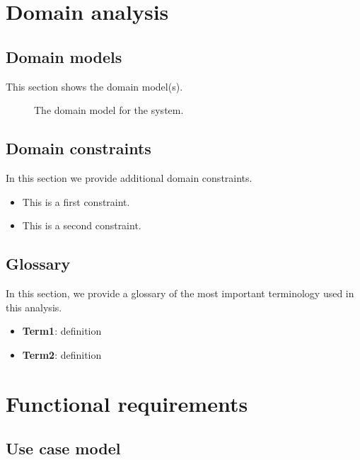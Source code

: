 \documentclass[a4paper,10pt]{article}
\begin{document}


\tableofcontents
\newpage

\section{Domain analysis}\label{sec:domain}
\subsection{Domain models}
This section shows the domain model(s).

\begin{figure}[!htp]
    \centering
    \caption{The domain model for the system.}\label{fig:domain_model}
\end{figure}

\subsection{Domain constraints}
In this section we provide additional domain constraints.

\begin{itemize}
    \item This is a first constraint.
    \item This is a second constraint.
\end{itemize}

\subsection{Glossary}
In this section, we provide a glossary of the most important terminology used
in this analysis.

\begin{itemize}
    \item \textbf{Term1}: definition
    \item \textbf{Term2}: definition
\end{itemize}

\section{Functional requirements}\label{sec:functional}
\subsection*{Use case model}
\end{document}
